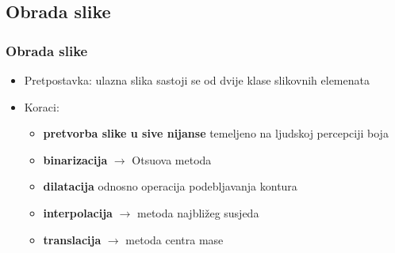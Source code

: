 \documentclass{beamer}
\begin{document}
\subsection{Obrada slike}
\begin{frame}
	\frametitle{Obrada slike}
	
		\begin{itemize}
			\item Pretpostavka: ulazna slika sastoji se od dvije klase slikovnih elemenata \\
			\item Koraci:
			\begin{itemize}
				\item \textbf{pretvorba slike u sive nijanse} temeljeno na ljudskoj percepciji boja
				\item \textbf{binarizacija} $\rightarrow$ Otsuova metoda 
				\item \textbf{dilatacija} odnosno operacija podebljavanja kontura
				\item \textbf{interpolacija} $\rightarrow$  metoda najbližeg susjeda 
				\item \textbf{translacija} $\rightarrow$  metoda centra mase
			\end{itemize}
		\end{itemize}
\end{frame}
\end{document}
